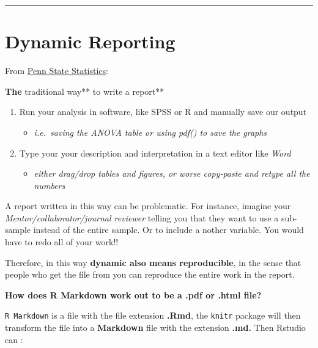 \documentclass[]{book}
\providecommand{\tightlist}{%
  \setlength{\itemsep}{0pt}\setlength{\parskip}{0pt}}
\theoremstyle{definition}
\theoremstyle{definition}
\theoremstyle{definition}
\theoremstyle{remark}
\begin{document}
\begin{center}\rule{0.5\linewidth}{\linethickness}\end{center}

\section{Dynamic Reporting}\label{dynamic-reporting}

From
\href{https://onlinecourses.science.psu.edu/statprogram/markdown}{Penn
State Statistics}:

\textbf{The }traditional way** to write a report**

\begin{enumerate}
\def\labelenumi{\arabic{enumi}.}
\tightlist
\item
  Run your analysis in software, like SPSS or R and manually save our
  output

  \begin{itemize}
  \tightlist
  \item
    \emph{i.e.~saving the ANOVA table or using pdf() to save the graphs}
  \end{itemize}
\item
  Type your your description and interpretation in a text editor like
  \emph{Word}

  \begin{itemize}
  \tightlist
  \item
    \emph{either drag/drop tables and figures, or worse copy-paste and
    retype all the numbers}
  \end{itemize}
\end{enumerate}

A report written in this way can be problematic. For instance, imagine
your \emph{Mentor/collaborator/journal reviewer} telling you that they
want to use a sub-sample instead of the entire sample. Or to include a
nother variable. You would have to redo all of your work!!

Therefore, in this way \textbf{dynamic also means reproducible}, in the
sense that people who get the file from you can reproduce the entire
work in the report.

\textbf{How does R Markdown work out to be a .pdf or .html file?}

\texttt{R\ Markdown} is a file with the file extension \textbf{.Rmd},
the \texttt{knitr} package will then transform the file into a
\textbf{Markdown} file with the extension \textbf{.md.} Then Rstudio can
\citep{xie2015}:
\end{document}
